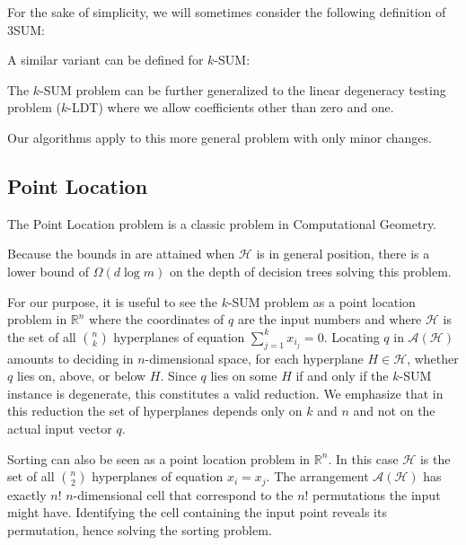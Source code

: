 For the sake of simplicity, we will sometimes consider the following definition of 3SUM\@:


A similar variant can be defined for \(k\)-SUM\@:


The \(k\)-SUM problem can be further generalized to the
linear degeneracy testing problem (\(k\)-LDT) where we allow
coefficients other than zero and one.
%

%
Our algorithms apply to this more general problem with only minor changes.




\subsection{Point Location}

The Point Location problem is a classic problem in Computational Geometry.



Because the bounds in  are attained when \(\mathcal{H}\) is in
general position, there is a lower bound of \(\Omega(d \log m)\) on the depth
of decision trees solving this problem.

For our purpose, it is useful to see the \(k\)-SUM problem as a point location
problem in \(\mathbb{R}^n\) where the coordinates of \(q\) are the input
numbers and where \(\mathcal{H}\) is the set of all \(n \choose k\) hyperplanes
of equation \(\sum_{j=1}^{k} x_{i_j} = 0\).
%
Locating \(q\) in \(\mathcal{A}(\mathcal{H})\)
amounts to deciding in $n$-dimensional space, for each hyperplane
\(H \in \mathcal{H}\), whether \(q\)
lies on, above, or below \(H\). Since \(q\) lies on some \(H\) if and only if
the \(k\)-SUM instance is degenerate, this constitutes a valid reduction.
%
We emphasize that in this reduction the set of hyperplanes depends only on $k$
and $n$ and not on the actual input vector $q$.

Sorting can also be seen as a point location problem in \(\mathbb{R}^n\).
In this case \(\mathcal{H}\) is the set of all \(n \choose 2\) hyperplanes of
equation \(x_i = x_j\). The arrangement \(\mathcal{A}(\mathcal{H})\) has
exactly \(n!\) \(n\)-dimensional cell that correspond to the \(n!\)
permutations the input might have. Identifying the cell containing the input
point reveals its permutation, hence solving the sorting problem.

